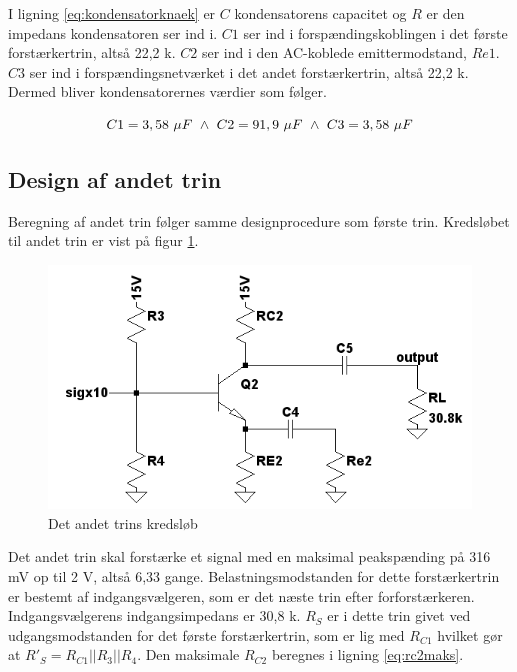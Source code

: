 I ligning \ref{eq:kondensatorknaek} er $C$ kondensatorens capacitet og $R$ er den impedans kondensatoren ser ind i. 
$C1$ ser ind i forspændingskoblingen i det første forstærkertrin, altså 22,2 k\Ohm. $C2$ ser ind i den AC-koblede emittermodstand, $Re1$. $C3$ ser ind i forspændingsnetværket i det andet forstærkertrin, altså 22,2 k\Ohm. Dermed bliver kondensatorernes værdier som følger.

\begin{equation}
C1=3,58~\mu F~\wedge ~C2=91,9~\mu F~\wedge ~C3=3,58~\mu F
\end{equation}



\subsection*{Design af andet trin}
Beregning af andet trin følger samme designprocedure som første trin. Kredsløbet til andet trin er vist på figur \ref{fig:andettrinkreds}.

\begin{figure}[h]
\centering
\includegraphics[scale=.6]{teknisk/forforstaerker/andettrinkreds.png}
\caption{Det andet trins kredsløb}
\label{fig:andettrinkreds}
\end{figure}

Det andet trin skal forstærke et signal med en maksimal peakspænding på 316 mV op til 2 V, altså 6,33 gange. Belastningsmodstanden for dette forstærkertrin er bestemt af indgangsvælgeren, som er det næste trin efter forforstærkeren. Indgangsvælgerens indgangsimpedans er 30,8 k\ohm {}. $R_S$ er i dette trin givet ved udgangsmodstanden for det første forstærkertrin, som er lig med $R_{C1}$ hvilket gør at $R'_S = R_{C1} || R_3 || R_4$. Den maksimale $R_{C2}$ beregnes i ligning \ref{eq:rc2maks}.

